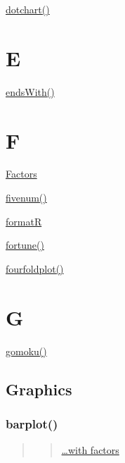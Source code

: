 \documentclass[]{book}
\begin{document}
\href{https://linkedin-learning.pxf.io/rweekly_dotchart}{dotchart()}

\hypertarget{e}{%
\chapter*{E}\label{e}}

\href{https://linkedin-learning.pxf.io/rweekly_simplestringmatch}{endsWith()}

\hypertarget{f}{%
\chapter*{F}\label{f}}

\href{https://linkedin-learning.pxf.io/rweekly_factor}{Factors}

\href{https://linkedin-learning.pxf.io/rweekly_pipeline}{fivenum()}

\href{https://linkedin-learning.pxf.io/rweekly_styleguides}{formatR}

\href{https://linkedin-learning.pxf.io/rweekly_fun}{fortune()}

\href{https://linkedin-learning.pxf.io/rweekly_fourfoldplot}{fourfoldplot()}

\hypertarget{g}{%
\chapter*{G}\label{g}}

\href{https://linkedin-learning.pxf.io/rweekly_fun}{gomoku()}

\hypertarget{graphics}{%
\section*{Graphics}\label{graphics}}

\hypertarget{barplot-1}{%
\subsection*{barplot()}\label{barplot-1}}

\begin{quote}
\begin{quote}
\href{https://linkedin-learning.pxf.io/rweekly_factor}{\ldots{}with factors}
\end{quote}
\end{quote}
\end{document}
